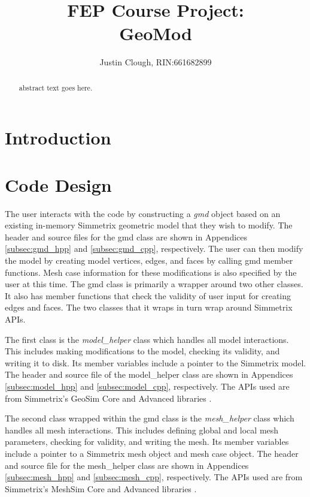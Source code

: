\documentclass[a4paper, 12pt]{article}
\author{Justin Clough, RIN:661682899}
\title{FEP Course Project: \\
        GeoMod}
\begin{document}
\maketitle

\begin{abstract}
abstract text goes here.

\end{abstract}

\newpage
\section{Introduction} \label{sec:intro}


\section{Code Design} \label{sec:design}
The user interacts with the code by constructing a \emph{gmd}
object based on an existing in-memory Simmetrix geometric model that they 
wish to modify. The header and source files for the gmd class 
are shown in Appendices \ref{subsec:gmd_hpp} and \ref{subsec:gmd_cpp}, 
respectively.  The user can then modify the model by 
creating model vertices, edges, and faces by calling
gmd member functions. Mesh case information for these 
modifications is also specified by the user at this time.
The gmd class is primarily a wrapper around two other classes. It also
has member functions that check the validity of user input for creating 
edges and faces. The two classes that it wraps in turn wrap around Simmetrix APIs.

The first class is the \emph{model\_helper} class 
which handles all model interactions. This includes making modifications to
the model, checking its validity, and writing it to disk. Its member variables
include a pointer to the Simmetrix model. The header and source file of the 
model\_helper class are shown in Appendices \ref{subsec:model_hpp} and 
\ref{subsec:model_cpp}, respectively. The APIs used are from Simmetrix's 
GeoSim Core and Advanced libraries \cite{Simmetrix}. 

The second class wrapped within the gmd class is the
\emph{mesh\_helper} class which handles all mesh interactions. This includes
defining global and local mesh parameters, checking for validity, and writing the mesh. 
Its member variables include a pointer to a Simmetrix mesh object and mesh case object. 
The header and source file for the mesh\_helper class are shown in 
Appendices \ref{subsec:mesh_hpp} and \ref{subsec:mesh_cpp}, respectively.
The APIs used are from Simmetrix's MeshSim Core and Advanced libraries 
\cite{Simmetrix}.
\end{document}
